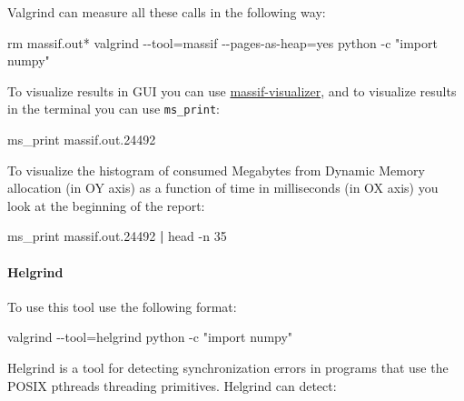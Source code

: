 \documentclass[
]{article}
\newenvironment{Shaded}{}{}
\newcommand{\AttributeTok}[1]{\textcolor[rgb]{0.49,0.56,0.16}{#1}}
\newcommand{\ExtensionTok}[1]{#1}
\newcommand{\FunctionTok}[1]{\textcolor[rgb]{0.02,0.16,0.49}{#1}}
\newcommand{\KeywordTok}[1]{\textcolor[rgb]{0.00,0.44,0.13}{\textbf{#1}}}
\newcommand{\NormalTok}[1]{#1}
\newcommand{\OperatorTok}[1]{\textcolor[rgb]{0.40,0.40,0.40}{#1}}
\newcommand{\PreprocessorTok}[1]{\textcolor[rgb]{0.74,0.48,0.00}{#1}}
\newcommand{\StringTok}[1]{\textcolor[rgb]{0.25,0.44,0.63}{#1}}
\begin{document}
Valgrind can measure all these calls in the following way:

\begin{Shaded}
\begin{Highlighting}[]
\FunctionTok{rm}\NormalTok{ massif.out}\PreprocessorTok{*}
\FunctionTok{valgrind} \AttributeTok{{-}{-}tool}\OperatorTok{=}\NormalTok{massif }\AttributeTok{{-}{-}pages{-}as{-}heap}\OperatorTok{=}\NormalTok{yes python }\AttributeTok{{-}c} \StringTok{"import numpy"}
\end{Highlighting}
\end{Shaded}

To visualize results in GUI you can use
\href{https://github.com/KDE/massif-visualizer}{massif-visualizer}, and
to visualize results in the terminal you can use \texttt{ms\_print}:

\begin{Shaded}
\begin{Highlighting}[]
\ExtensionTok{ms\_print}\NormalTok{ massif.out.24492}
\end{Highlighting}
\end{Shaded}

To visualize the histogram of consumed Megabytes from Dynamic Memory
allocation (in OY axis) as a function of time in milliseconds (in OX
axis) you look at the beginning of the report:

\begin{Shaded}
\begin{Highlighting}[]
\ExtensionTok{ms\_print}\NormalTok{ massif.out.24492 }\KeywordTok{|} \FunctionTok{head} \AttributeTok{{-}n}\NormalTok{ 35}
\end{Highlighting}
\end{Shaded}

\hypertarget{helgrind}{%
\paragraph{Helgrind}\label{helgrind}}

To use this tool use the following format:

\begin{Shaded}
\begin{Highlighting}[]
\FunctionTok{valgrind} \AttributeTok{{-}{-}tool}\OperatorTok{=}\NormalTok{helgrind python }\AttributeTok{{-}c} \StringTok{"import numpy"}
\end{Highlighting}
\end{Shaded}

Helgrind is a tool for detecting synchronization errors in programs that
use the POSIX pthreads threading primitives. Helgrind can detect:
\end{document}
